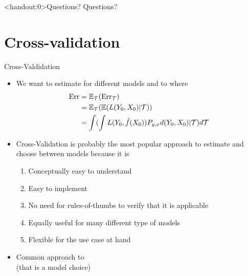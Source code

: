 \documentclass[10pt]{beamer}
\begin{document}
\begin{frame}<handout:0>{Questions?}
Questions?
\end{frame}


\section{Cross-validation}
\frame{\sectionpage}


\begin{frame}{Cross-Valdidation}






\begin{itemize}
\item We want to estimate  for different models and to  where
\begin{align*}
\text{Err} & = \operatorname{\mathbb{E}}_\mathcal{T} (\text{Err}_\mathcal{T}) \\
 & = \operatorname{\mathbb{E}}_\mathcal{T} (\operatorname{\mathbb{E}}(L(Y_0,X_0)|\mathcal{T})) \\
& = \int (\int L(Y_0, \hat{f}(X_0)) P_{y,x} d(Y_0,X_0) |\mathcal{T}) d\mathcal{T}
\end{align*}
\item Cross-Validation is probably the most popular approach to estimate  and choose between models because it is
\begin{enumerate}
\item Conceptually easy to understand
\item Easy to implement
\item No need for rules-of-thumbs to verify that it is applicable
\item Equally useful for many different type of models
\item Flexible for the use case at hand
\end{enumerate}
\pause
\item Common approach to \\(that is a model choice)
\end{itemize}

\end{frame}
\end{document}
